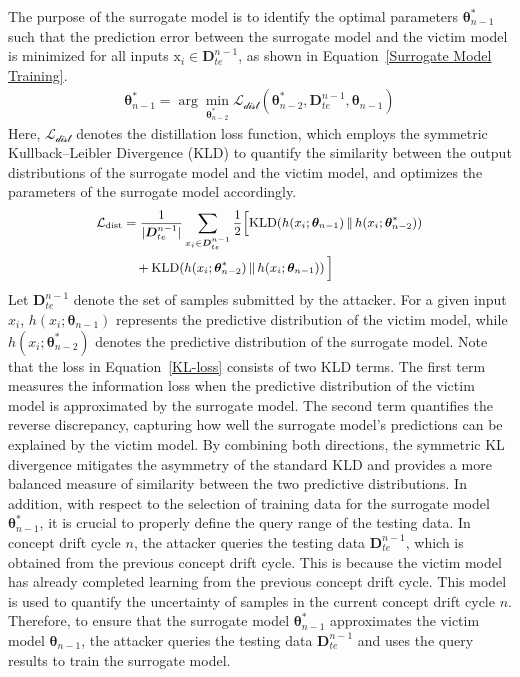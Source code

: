 The purpose of the surrogate model is to identify the optimal parameters $\bm{\theta}_{n-1}^{*}$ such that the prediction error between the surrogate model and the victim model is minimized for all inputs $\bm{\mathrm{x}}_{i} \in \bm{D}_{te}^{n-1}$, as shown in Equation~\ref{Surrogate Model Training}.
\begin{equation}
	\begin{aligned}
		\bm{\theta}_{n-1}^{*} = \arg\min_{\bm{\theta}_{n-2}^{*}} \mathcal{L_{\text{dist}}} \left( \bm{\theta}_{n-2}^{*}, \bm{D}_{te}^{n-1} , \bm{\theta}_{n-1} \right)
	\end{aligned}
	\label{Surrogate Model Training}
\end{equation}
Here, $\mathcal{L_{\text{dist}}}$ denotes the distillation loss function, which employs the symmetric Kullback–Leibler Divergence (KLD) to quantify the similarity between the output distributions of the surrogate model and the victim model, and optimizes the parameters of the surrogate model accordingly.
\begin{equation}
	\small
	\begin{aligned}
		\mathcal{L_{\text{dist}}} 
		&= \frac{1}{|\bm{D}_{te}^{n-1}|} \sum_{x_i \in \bm{D}_{te}^{n-1}} \frac{1}{2} \Big[ 
		\mathrm{KLD}\!\left(h(x_i; \bm{\theta}_{n-1})\,\|\,h(x_i; \bm{\theta}_{n-2}^{*} )\right) \\
		&\quad + \mathrm{KLD}\!\left(h(x_i; \bm{\theta}_{n-2}^{*})\,\|\,h(x_i; \bm{\theta}_{n-1})\right) \Big]
	\end{aligned}
	\label{KL-loss}
\end{equation}
Let $\bm{D}_{te}^{n-1}$ denote the set of samples submitted by the attacker.
For a given input $x_i$, $h(x_i; \bm{\theta}_{n-1})$ represents the predictive distribution of the victim model, while $h(x_i; \bm{\theta}_{n-2}^{*})$ denotes the predictive distribution of the surrogate model.
Note that the loss in Equation~\ref{KL-loss} consists of two KLD terms. 
The first term measures the information loss when the predictive distribution of the victim model is approximated by the surrogate model. 
The second term quantifies the reverse discrepancy, capturing how well the surrogate model’s predictions can be explained by the victim model. 
By combining both directions, the symmetric KL divergence mitigates the asymmetry of the standard KLD and provides a more balanced measure of similarity between the two predictive distributions.
In addition, with respect to the selection of training data for the surrogate model $\bm{\theta}_{n-1}^{*}$, it is crucial to properly define the query range of the testing data.
In concept drift cycle $n$, the attacker queries the testing data $\bm{D}_{te}^{n-1}$, which is obtained from the previous concept drift cycle.
This is because the victim model has already completed learning from the previous concept drift cycle.
This model is used to quantify the uncertainty of samples in the current concept drift cycle $n$.
Therefore, to ensure that the surrogate model $\bm{\theta}_{n-1}^{*}$ approximates the victim model $\bm{\theta}_{n-1}$, the attacker queries the testing data $\bm{D}_{te}^{n-1}$ and uses the query results to train the surrogate model.



